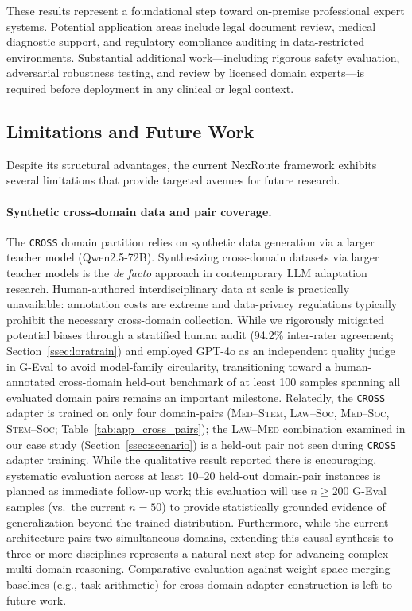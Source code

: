 \documentclass[a4paper,fleql]{cas-sc}
\begin{document}
These results represent a foundational step toward on-premise professional
expert systems. Potential application areas include legal document review,
medical diagnostic support, and regulatory compliance auditing in
data-restricted environments. Substantial additional work---including rigorous
safety evaluation, adversarial robustness testing, and review by licensed
domain experts---is required before deployment in any clinical or legal
context.

\subsection{Limitations and Future Work}
\label{sec:limitations}
Despite its structural advantages, the current NexRoute framework exhibits
several limitations that provide targeted avenues for future research.

\paragraph{Synthetic cross-domain data and pair coverage.}
The \texttt{CROSS} domain partition relies on synthetic data generation via a
larger teacher model (Qwen2.5-72B). Synthesizing cross-domain datasets via larger teacher models is the
\emph{de facto} approach in contemporary LLM adaptation research.
Human-authored interdisciplinary data at scale is practically unavailable:
annotation costs are extreme and data-privacy regulations typically prohibit
the necessary cross-domain collection. While we rigorously mitigated potential biases through
a stratified human audit (94.2\% inter-rater agreement;
Section~\ref{ssec:loratrain}) and employed GPT-4o as an independent quality
judge in G-Eval to avoid model-family circularity, transitioning toward a human-annotated cross-domain held-out benchmark
of at least 100 samples spanning all evaluated domain pairs remains an
important milestone. Relatedly, the \texttt{CROSS} adapter is trained on only four
domain-pairs (\textsc{Med}--\textsc{Stem}, \textsc{Law}--\textsc{Soc},
\textsc{Med}--\textsc{Soc}, \textsc{Stem}--\textsc{Soc};
Table~\ref{tab:app_cross_pairs}); the \textsc{Law}--\textsc{Med} combination
examined in our case study (Section~\ref{ssec:scenario}) is a held-out pair
not seen during \texttt{CROSS} adapter training. While the qualitative result reported there is encouraging, systematic
evaluation across at least 10--20 held-out domain-pair instances is planned
as immediate follow-up work; this evaluation will use $n{\geq}200$ G-Eval
samples (vs.\ the current $n{=}50$) to provide statistically grounded
evidence of generalization beyond the trained distribution. Furthermore, while the current architecture pairs
two simultaneous domains, extending this causal synthesis to three or more
disciplines represents a natural next step for advancing complex
multi-domain reasoning.
Comparative evaluation against weight-space merging baselines (e.g., task arithmetic) for
cross-domain adapter construction is left to future work.
\end{document}
